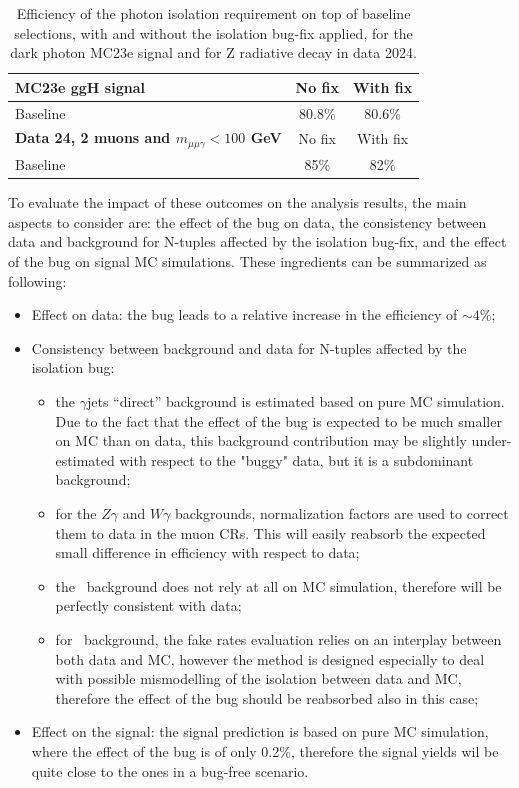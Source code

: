 \begin{table}[htbp]
\caption{Efficiency of the photon isolation requirement on top of baseline selections, with and without the isolation bug-fix applied, for the dark photon MC23e signal and for Z radiative decay in data 2024.}
\label{tab:isobug_eff_sig}
\centering
\begin{tabular}{lcc}
\hline
\textbf{MC23e ggH signal} & No fix & With fix \\\hline
Baseline & 80.8\% & 80.6\%\\
\hline\hline
\textbf{Data 24, 2 muons and $m_{\mu\mu\gamma}<100$ GeV} & No fix & With fix \\\hline
Baseline & 85\% & 82\%\\
\hline
\end{tabular}
\end{table}

To evaluate the impact of these outcomes on the analysis results, the main aspects to consider are: the effect of the bug on data, the consistency between data and background for N-tuples affected by the isolation bug-fix, and the effect of the bug on signal MC simulations. 
These ingredients can be summarized as following:

\begin{itemize}
  \item Effect on data: the bug leads to a relative increase in the efficiency of $\sim 4\%$;
  \item Consistency between background and data for N-tuples affected by the isolation bug:
  \begin{itemize}
  \item the $\gamma$jets ``direct'' background is estimated based on pure MC simulation. Due to the fact that the effect of the bug is expected to be much smaller on MC than on data, this background contribution may be slightly under-estimated with respect to the "buggy" data, but it is a subdominant background;
  \item for the $Z\gamma$ and $W\gamma$ backgrounds, normalization factors are used to correct them to data in the muon CRs. This will easily reabsorb the expected small difference in efficiency with respect to data; 
  \item the \efakey\ background does not rely at all on MC simulation, therefore will be perfectly consistent with data;
  \item for \jfakey\ background, the fake rates evaluation relies on an interplay between both data and MC, however the method is designed especially to deal with possible mismodelling of the isolation between data and MC, therefore the effect of the bug should be reabsorbed also in this case;
  \end{itemize}
  \item Effect on the signal: the signal prediction is based on pure MC simulation, where the effect of the bug is of only 0.2\%, therefore  the signal yields wil be quite close to the ones in a bug-free scenario.
\end{itemize}

